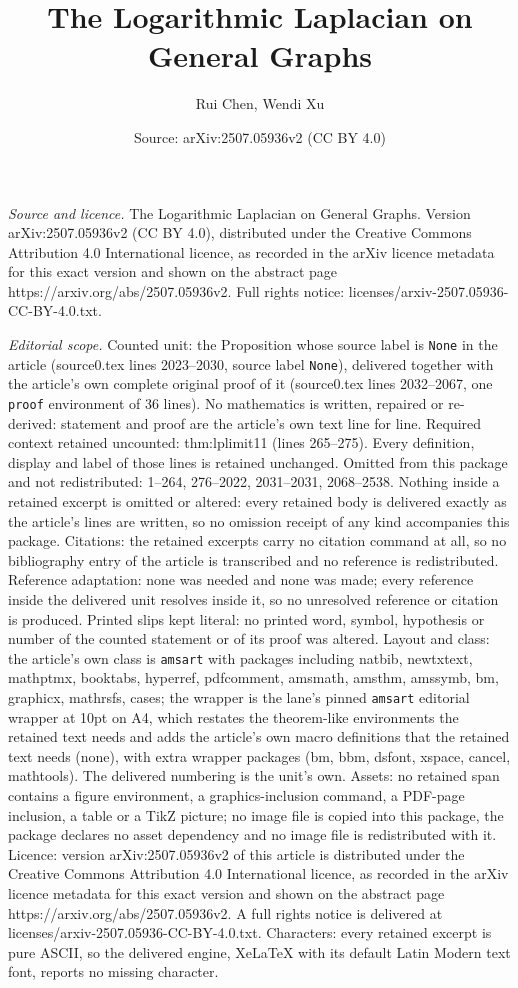 \documentclass[10pt,a4paper]{amsart}
\title[The Logarithmic Laplacian on General Graphs]{The Logarithmic Laplacian on General Graphs}
\author{Rui Chen, Wendi Xu}
\date{Source: arXiv:2507.05936v2 (CC BY 4.0)}
\begin{document}
\maketitle

\noindent\emph{Source and licence.} The Logarithmic Laplacian on General Graphs. Version arXiv:2507.05936v2 (CC BY 4.0), distributed under the Creative Commons Attribution 4.0 International licence, as recorded in the arXiv licence metadata for this exact version and shown on the abstract page https://arxiv.org/abs/2507.05936v2. Full rights notice: licenses/arxiv-2507.05936-CC-BY-4.0.txt.\par\smallskip

\noindent\textit{Editorial scope.} Counted unit: the Proposition whose source label is \texttt{None} in the article (source0.tex lines 2023--2030, source label \texttt{None}), delivered together with the article's own complete original proof of it (source0.tex lines 2032--2067, one \texttt{proof} environment of 36 lines). No mathematics is written, repaired or re-derived: statement and proof are the article's own text line for line. Required context retained uncounted: thm:lplimit11 (lines 265--275). Every definition, display and label of those lines is retained unchanged. Omitted from this package and not redistributed: 1--264, 276--2022, 2031--2031, 2068--2538. Nothing inside a retained excerpt is omitted or altered: every retained body is delivered exactly as the article's lines are written, so no omission receipt of any kind accompanies this package. Citations: the retained excerpts carry no citation command at all, so no bibliography entry of the article is transcribed and no reference is redistributed. Reference adaptation: none was needed and none was made; every reference inside the delivered unit resolves inside it, so no unresolved reference or citation is produced. Printed slips kept literal: no printed word, symbol, hypothesis or number of the counted statement or of its proof was altered. Layout and class: the article's own class is \texttt{amsart} with packages including natbib, newtxtext, mathptmx, booktabs, hyperref, pdfcomment, amsmath, amsthm, amssymb, bm, graphicx, mathrsfs, cases; the wrapper is the lane's pinned \texttt{amsart} editorial wrapper at 10pt on A4, which restates the theorem-like environments the retained text needs and adds the article's own macro definitions that the retained text needs (none), with extra wrapper packages (bm, bbm, dsfont, xspace, cancel, mathtools). The delivered numbering is the unit's own. Assets: no retained span contains a figure environment, a graphics-inclusion command, a PDF-page inclusion, a table or a TikZ picture; no image file is copied into this package, the package declares no asset dependency and no image file is redistributed with it. Licence: version arXiv:2507.05936v2 of this article is distributed under the Creative Commons Attribution 4.0 International licence, as recorded in the arXiv licence metadata for this exact version and shown on the abstract page https://arxiv.org/abs/2507.05936v2. A full rights notice is delivered at licenses/arxiv-2507.05936-CC-BY-4.0.txt. Characters: every retained excerpt is pure ASCII, so the delivered engine, XeLaTeX with its default Latin Modern text font, reports no missing character.
\end{document}
